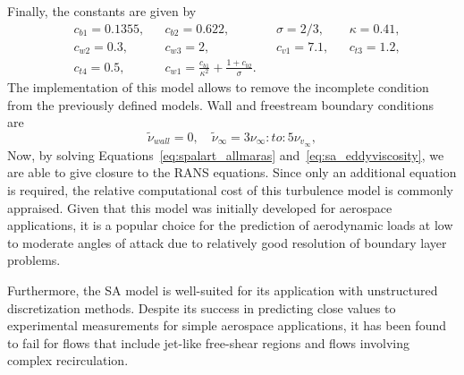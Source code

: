 Finally, the constants are given by 
\begin{align}
    &c_{b1} = 0.1355,& &c_{b2} =0.622,& &\sigma = 2/3,& &\kappa=0.41, \\
    &c_{w2} = 0.3,&    &c_{w3} =2,&     &c_{v1} = 7.1,&   &c_{t3}=1.2,  \\
    &c_{t4} = 0.5,&      &c_{w1} = \frac{c_{b1}}{\kappa^2} + \frac{1+c_{b2}}{\sigma}.
\end{align}
The implementation of this model allows to remove the incomplete condition from the previously defined models. Wall and freestream boundary conditions are~\cite{nasaresource}
\begin{equation}
    \tilde \nu_{wall} = 0,\quad \tilde\nu_{\infty}=3 \nu_{\infty}:to:5\nu_{v_\infty},
\end{equation}
Now, by solving Equations~\ref{eq:spalart_allmaras} and~\ref{eq:sa_eddyviscosity}, we are able to give closure to the RANS equations. Since only an additional equation is required, the relative computational cost of this turbulence model is commonly appraised. Given that this model was initially developed for aerospace applications, it is a popular choice for the prediction of aerodynamic loads at low to moderate angles of attack due to relatively good resolution of boundary layer problems. 

Furthermore, the SA model is well-suited for its application with unstructured discretization methods. Despite its success in predicting close values to experimental measurements for simple aerospace applications, it has been found to fail for flows that include jet-like free-shear regions and flows involving complex recirculation.
